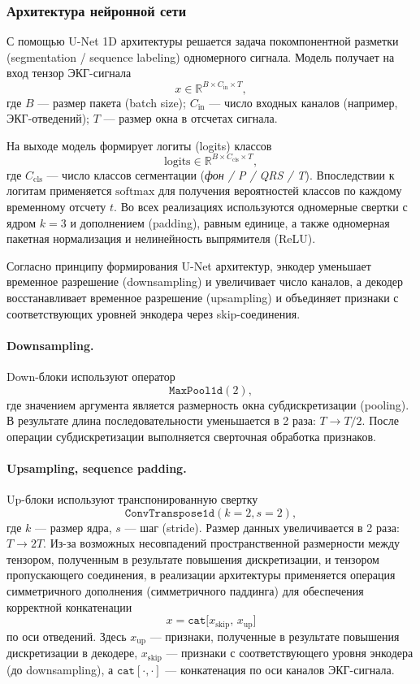 \documentclass[10pt,a4paper]{book}
\begin{document}
\subsubsection{Архитектура нейронной сети}

С помощью U-Net 1D архитектуры решается задача покомпонентной разметки (segmentation / sequence labeling) одномерного сигнала. Модель получает на вход тензор ЭКГ-сигнала
\[
x \in \mathbb{R}^{B \times C_{\text{in}} \times T},
\]
где $B$ --- размер пакета (batch size); $C_{\text{in}}$ --- число входных каналов (например, ЭКГ-отведений); $T$ --- размер окна в отсчетах сигнала.

На выходе модель формирует логиты (logits) классов
\[
\text{logits} \in \mathbb{R}^{B \times C_{\text{cls}} \times T},
\]
где $C_{\text{cls}}$ --- число классов сегментации (\textit{фон / P / QRS / T}). Впоследствии к логитам применяется $\mathrm{softmax}$ для получения вероятностей классов по каждому временному отсчету $t$. Во всех реализациях используются одномерные свертки с ядром $k=3$ и дополнением (padding), равным единице, а также одномерная пакетная нормализация и нелинейность выпрямителя (ReLU).

Согласно принципу формирования U-Net архитектур, энкодер уменьшает временное разрешение (downsampling) и увеличивает число каналов, а декодер восстанавливает временное разрешение (upsampling) и объединяет признаки с соответствующих уровней энкодера через skip-соединения.

\paragraph{Downsampling.}
Down-блоки используют оператор
\[
\texttt{MaxPool1d}(2),
\]
где значением аргумента является размерность окна субдискретизации (pooling). В результате длина последовательности уменьшается в 2 раза: $T \rightarrow T/2$. После операции субдискретизации выполняется сверточная обработка признаков.

\paragraph{Upsampling, sequence padding.}
Up-блоки используют транспонированную свертку
\[
\texttt{ConvTranspose1d}(k{=}2, s{=}2),
\]
где $k$ --- размер ядра, $s$ --- шаг (stride). Размер данных увеличивается в 2 раза: $T \rightarrow 2T$. Из-за возможных несовпадений пространственной размерности между тензором, полученным в результате повышения дискретизации, и тензором пропускающего соединения, в реализации архитектуры применяется операция симметричного дополнения (симметричного паддинга) для обеспечения корректной конкатенации
\[
x = \texttt{cat}\big[x_{\text{skip}},\, x_{\text{up}}\big]
\]
по оси отведений. Здесь $x_{\text{up}}$ --- признаки, полученные в результате повышения дискретизации в декодере, $x_{\text{skip}}$ --- признаки с соответствующего уровня энкодера (до downsampling), а $\texttt{cat}[\cdot,\cdot]$ --- конкатенация по оси каналов ЭКГ-сигнала.
\end{document}
